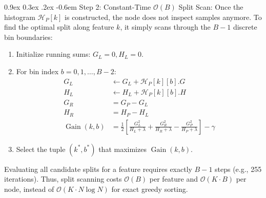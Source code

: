 \documentclass[11pt,a4paper]{article}
\makeatletter
\renewcommand\paragraph{\@startsection{paragraph}{4}{\z@}%
                                     {0.9ex \@plus0.3ex \@minus.2ex}%
                                     {-0.6em}%
                                     {\normalfont\normalsize\bfseries}}
\newcommand{\Gain}{\operatorname{Gain}}
\makeatother
\begin{document}
\paragraph{Step 2: Constant-Time \texorpdfstring{$\mathcal{O}(B)$}{O(B)} Split Scan:}
Once the histogram $\mathcal{H}_P[k]$ is constructed, the node does not inspect samples anymore. To find the optimal split along feature $k$, it simply scans through the $B - 1$ discrete bin boundaries:
\begin{enumerate}
    \item Initialize running sums: $G_L = 0, H_L = 0$.
    \item For bin index $b = 0, 1, \dots, B - 2$:
    \begin{align}
        G_L &\leftarrow G_L + \mathcal{H}_P[k][b].G \nonumber \\
        H_L &\leftarrow H_L + \mathcal{H}_P[k][b].H \nonumber \\
        G_R &= G_P - G_L \nonumber \\
        H_R &= H_P - H_L \nonumber \\
        \Gain(k, b) &= \frac{1}{2} \left[ \frac{G_L^2}{H_L + \lambda} + \frac{G_R^2}{H_R + \lambda} - \frac{G_P^2}{H_P + \lambda} \right] - \gamma
    \end{align}
    \item Select the tuple $(k^*, b^*)$ that maximizes $\Gain(k, b)$.
\end{enumerate}
Evaluating all candidate splits for a feature requires exactly $B - 1$ steps (e.g., 255 iterations). Thus, split scanning costs $\mathcal{O}(B)$ per feature and $\mathcal{O}(K \cdot B)$ per node, instead of $\mathcal{O}(K \cdot N \log N)$ for exact greedy sorting.
\end{document}
